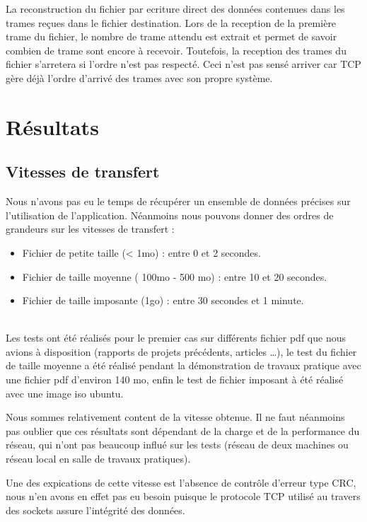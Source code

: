 \documentclass[a4paper, 11pt, french]{report}
\begin{document}
			
			La reconstruction du fichier par ecriture direct des données contenues dans les trames reçues dans le fichier destination. Lors de la reception de la première trame du fichier, le nombre de trame attendu est extrait et permet de savoir combien de trame sont encore à recevoir. 
			Toutefois, la reception des trames du fichier s'arretera si l'ordre n'est pas respecté. Ceci n'est pas sensé arriver car TCP gère déjà l'ordre d'arrivé des trames avec son propre système.
			
\chapter{Résultats}
	\section{Vitesses de transfert}  %
	Nous n'avons pas eu le temps de récupérer un ensemble de données précises sur l'utilisation de l'application. Néanmoins nous pouvons donner des ordres de grandeurs sur les vitesses de transfert : 
		~\\
		\begin{itemize}
			\item Fichier de petite taille (< 1mo) : entre 0 et 2 secondes.
			\item Fichier de taille moyenne ( 100mo - 500 mo) : entre 10 et 20 secondes.
			\item Fichier de taille imposante (1go) : entre 30 secondes et 1 minute.
		\end{itemize}
		~\\

	Les tests ont été réalisés pour le premier cas sur différents fichier pdf que nous avions à disposition (rapports de projets précédents, articles \ldots), le test du fichier de taille moyenne a été réalisé pendant la démonstration de travaux pratique avec une fichier pdf d'environ 140 mo, enfin le test de fichier imposant à été réalisé avec une image iso ubuntu.
	\newline

	Nous sommes relativement content de la vitesse obtenue. Il ne faut néanmoins pas oublier que ces résultats sont dépendant de la charge et de la performance du réseau, qui n'ont pas beaucoup influé sur les tests (réseau de deux machines ou réseau local en salle de travaux pratiques).
	\newline

	Une des expications de cette vitesse est l'absence de contrôle d'erreur type CRC, nous n'en avons en effet pas eu besoin puisque le protocole TCP utilisé au travers des sockets assure l'intégrité des données.
\end{document}
